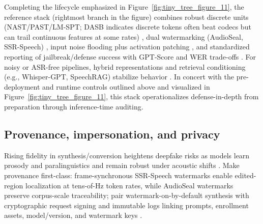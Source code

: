 \documentclass{article}
\begin{document}
Completing the lifecycle emphasized in Figure~\ref{fig:tiny_tree_figure_11}, the reference stack (rightmost branch in the figure) combines robust discrete units (NAST/PAST/LM-SPT; DASB indicates discrete tokens often beat codecs but can trail continuous features at some rates) \cite{mousavi2024dasbdiscreteaudiospeechbenchmark,mousavi2024howshouldweextractdiscreteaudiotokenssel,onda2025benchmarkingprosodyencodingdiscretespeec,har-tuv2025pastphoneticacousticspeechtokenizer,jo2025lmsptalignedsemanticdistillationspeechto,messica2024nastnoiseawarespeechtokenizationlanguage}, dual watermarking (AudioSeal, SSR-Speech) \cite{zhao2024advancingspeechlanguagemodelsscalingsupe,wang2025ssrspeechtowardsstablesaferobustzeroshot}, input noise flooding plus activation patching \cite{peri2024speechguardexploringadversarialrobustnes,djanibekov2025spiritpatchingspeechlanguagemodelsagains}, and standardized reporting of jailbreak/defense success with GPT-Score and WER trade-offs \cite{peri2024speechguardexploringadversarialrobustnes,djanibekov2025spiritpatchingspeechlanguagemodelsagains,vashishth2024stabspeechtokenizerassessmentbenchmark}. For noisy or ASR-free pipelines, hybrid representations and retrieval conditioning (e.g., Whisper-GPT, SpeechRAG) stabilize behavior \cite{verma2024whispergpthybridrepresentationaudiolarge,min2025speechretrievalaugmentedgenerationwithou}. In concert with the pre-deployment and runtime controls outlined above and visualized in Figure~\ref{fig:tiny_tree_figure_11}, this stack operationalizes defense-in-depth from preparation through inference-time auditing.

\subsection{Provenance, impersonation, and privacy} \label{subsec:provenance,impersonation,andprivacy}
Rising fidelity in synthesis/conversion heightens deepfake risks as models learn prosody and paralinguistics and remain robust under acoustic shifts \cite{chen2025variationalframeworkimprovingnaturalness,verma2024whispergpthybridrepresentationaudiolarge,maimon2025salmonsuiteacousticlanguagemodelevaluati,entry2025augmentationinvariantdiscreterepresentat}. Make provenance first-class: frame-synchronous SSR-Speech watermarks enable edited-region localization at tens-of-Hz token rates, while AudioSeal watermarks preserve corpus-scale traceability; pair watermark-on-by-default synthesis with cryptographic request signing and immutable logs linking prompts, enrollment assets, model/version, and watermark keys \cite{wang2025ssrspeechtowardsstablesaferobustzeroshot,zhao2024advancingspeechlanguagemodelsscalingsupe,gong2024seamlessexpressivelmspeechlanguagemodele}.
\end{document}
